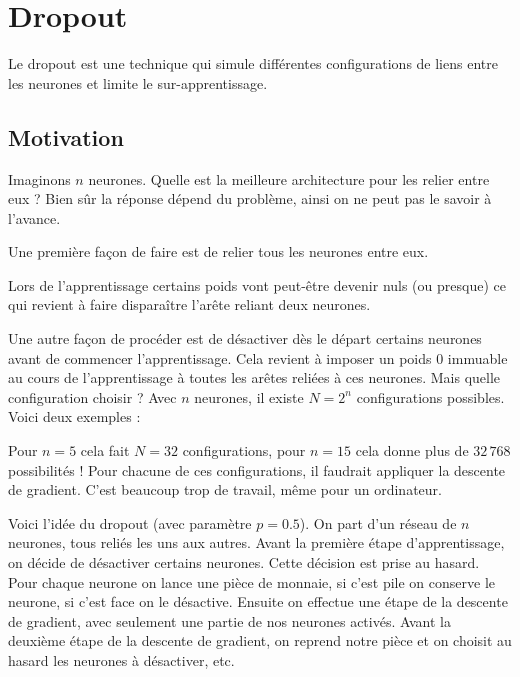 \documentclass[11pt,class=report,crop=false]{standalone}
\begin{document}
\section{Dropout}

Le dropout est une technique qui simule différentes configurations de liens entre les neurones et limite le sur-apprentissage.


\subsection{Motivation}

Imaginons $n$ neurones. Quelle est la meilleure architecture pour les relier entre eux ?
Bien sûr la réponse dépend du problème, ainsi on ne peut pas le savoir à l'avance. 

Une première façon de faire est de relier tous les neurones entre eux.



Lors de l'apprentissage certains poids vont peut-être devenir nuls (ou presque) ce qui revient à faire disparaître l'arête reliant deux neurones.



Une autre façon de procéder est de désactiver dès le départ certains neurones avant de commencer l'apprentissage. Cela revient à imposer un poids $0$ immuable au cours de l'apprentissage à toutes les arêtes reliées à ces neurones.
Mais quelle configuration choisir ? Avec $n$ neurones, il existe $N = 2^n$ configurations possibles. Voici deux exemples :


Pour $n=5$ cela fait $N=32$ configurations, pour $n=15$ cela donne plus de $32\,768$ possibilités ! Pour chacune de ces configurations, il faudrait appliquer la descente de gradient. C'est beaucoup trop de travail, même pour un ordinateur.

Voici l'idée du dropout (avec paramètre $p=0.5$).
On part d'un réseau de $n$ neurones, tous reliés les uns aux autres.
Avant la première étape d'apprentissage, on décide de désactiver certains neurones.
Cette décision est prise au hasard. Pour chaque neurone on lance une pièce de monnaie, si c'est \og{}pile\fg{} on conserve le neurone, si c'est \og{}face\fg{} on le désactive. Ensuite on effectue une étape de la descente de gradient, avec seulement une partie de nos neurones activés. Avant la deuxième étape de la descente de gradient, on reprend notre pièce et on choisit au hasard les neurones à désactiver, etc.
\end{document}
